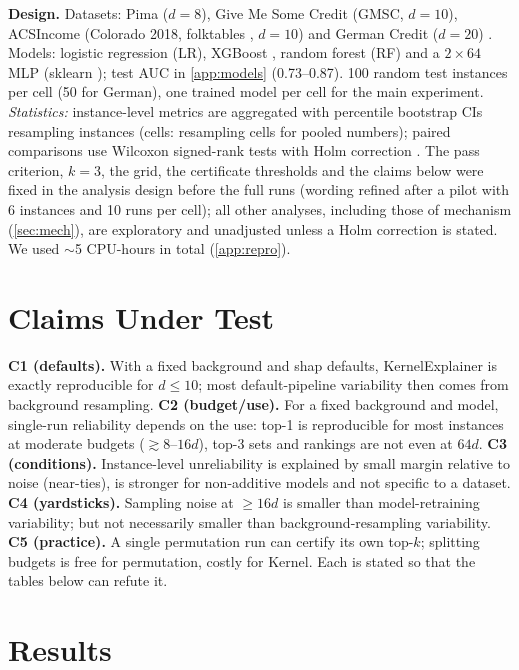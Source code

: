 \documentclass{article}
\begin{document}
\textbf{Design.} Datasets: Pima ($d{=}8$), Give Me Some Credit (GMSC, $d{=}10$), ACSIncome (Colorado 2018, folktables \citep{ding2021}, $d{=}10$) and German Credit ($d{=}20$) \citep{german}. Models: logistic regression (LR), XGBoost \citep{chen2016xgboost}, random forest (RF) and a $2\times64$ MLP (sklearn \citep{pedregosa2011}); test AUC in \cref{app:models} (0.73--0.87). 100 random test instances per cell (50 for German), one trained model per cell for the main experiment. \emph{Statistics:} instance-level metrics are aggregated with percentile bootstrap CIs resampling instances (cells: resampling cells for pooled numbers); paired comparisons use Wilcoxon signed-rank tests with Holm correction \citep{wilcoxon1945,holm1979}. The pass criterion, $k{=}3$, the grid, the certificate thresholds and the claims below were fixed in the analysis design before the full runs (wording refined after a pilot with 6 instances and 10 runs per cell); all other analyses, including those of mechanism (\cref{sec:mech}), are exploratory and unadjusted unless a Holm correction is stated. We used ${\sim}$5 CPU-hours in total (\cref{app:repro}).

\section{Claims Under Test}\label{sec:claims}
\textbf{C1 (defaults).} With a fixed background and shap defaults, KernelExplainer is exactly reproducible for $d\le10$; most default-pipeline variability then comes from background resampling.
\textbf{C2 (budget/use).} For a fixed background and model, single-run reliability depends on the use: top-1 is reproducible for most instances at moderate budgets ($\gtrsim8$--$16d$), top-3 sets and rankings are not even at $64d$.
\textbf{C3 (conditions).} Instance-level unreliability is explained by small margin relative to noise (near-ties), is stronger for non-additive models and not specific to a dataset.
\textbf{C4 (yardsticks).} Sampling noise at $\ge16d$ is smaller than model-retraining variability; but not necessarily smaller than background-resampling variability.
\textbf{C5 (practice).} A single permutation run can certify its own top-$k$; splitting budgets is free for permutation, costly for Kernel.
Each is stated so that the tables below can refute it.

\section{Results}\label{sec:results}
\end{document}
